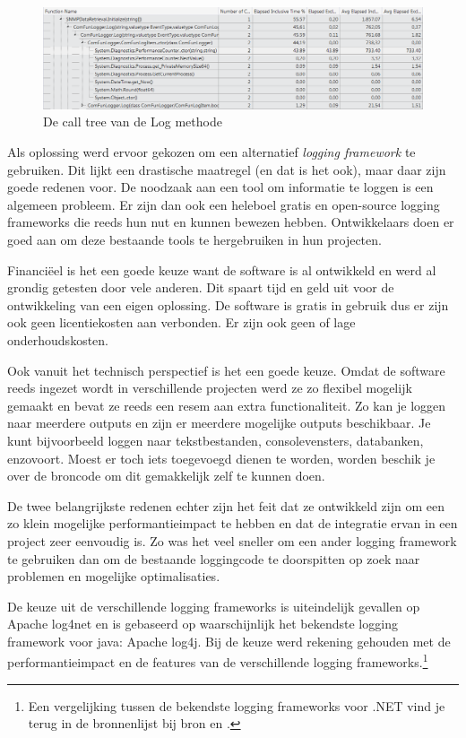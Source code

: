 \begin{figure}[h]
	\centering
	\includegraphics[scale=0.50]{figures/profiler/call-tree-performancecounter}
	\caption{De call tree van de Log methode}
	\label{call-tree-performancecounter}
\end{figure}


Als oplossing werd ervoor gekozen om een alternatief \emph{logging framework} te gebruiken.
Dit lijkt een drastische maatregel (en dat is het ook), maar daar zijn goede redenen voor.
De noodzaak aan een tool om informatie te loggen is een algemeen probleem.
Er zijn dan ook een heleboel gratis en open-source logging frameworks die reeds hun nut en kunnen bewezen hebben.
Ontwikkelaars doen er goed aan om deze bestaande tools te hergebruiken in hun projecten.

Financiëel is het een goede keuze want de software is al ontwikkeld en werd al grondig getesten door vele anderen.
Dit spaart tijd en geld uit voor de ontwikkeling van een eigen oplossing.
De software is gratis in gebruik dus er zijn ook geen licentiekosten aan verbonden.
Er zijn ook geen of lage onderhoudskosten.

Ook vanuit het technisch perspectief is het een goede keuze.
Omdat de software reeds ingezet wordt in verschillende projecten werd ze zo flexibel mogelijk gemaakt en bevat ze reeds een resem aan extra functionaliteit.
Zo kan je loggen naar meerdere outputs en zijn er meerdere mogelijke outputs beschikbaar.
Je kunt bijvoorbeeld loggen naar tekstbestanden, consolevensters, databanken, enzovoort.
Moest er toch iets toegevoegd dienen te worden, worden beschik je over de broncode om dit gemakkelijk zelf te kunnen doen.

De twee belangrijkste redenen echter zijn het feit dat ze ontwikkeld zijn om een zo klein mogelijke performantieimpact te hebben en
dat de integratie ervan in een project zeer eenvoudig is.
Zo was het veel sneller om een ander logging framework te gebruiken dan om de bestaande loggingcode te doorspitten op zoek naar problemen en mogelijke optimalisaties.

De keuze uit de verschillende logging frameworks is uiteindelijk gevallen op Apache log4net en is gebaseerd op waarschijnlijk het bekendste logging framework voor java: Apache log4j.
Bij de keuze werd rekening gehouden met de performantieimpact en de features van de verschillende logging frameworks.\footnote{
	Een vergelijking tussen de bekendste logging frameworks voor .NET vind je 
	terug in de bronnenlijst bij bron \cite{logging-frameworks-and-performance} en \cite{logging-frameworks}.
}

